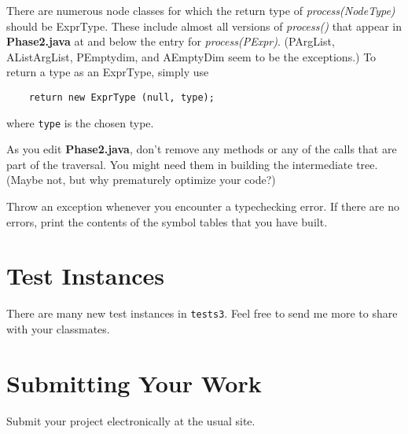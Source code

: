 \documentclass[11pt]{article}
\begin{document}
There are numerous node classes for which the return type of {\it process(NodeType)} should be ExprType.  These include almost all versions of {\it process()} that appear in {\bf Phase2.java} at and below the entry for {\it{process(PExpr)}}.  (PArgList, AListArgList, PEmptydim, and AEmptyDim seem to be the exceptions.)  To return a type as an ExprType, simply use
\begin{verbatim}
    return new ExprType (null, type);
\end{verbatim}
where \verb'type' is the chosen type.

As you edit {\bf Phase2.java}, don't remove any methods or any of the calls that are part of the traversal.  You might need them in building the intermediate tree.  (Maybe not, but why prematurely optimize your code?)

Throw an exception whenever you encounter a typechecking error.  If there are no errors, print the contents of the symbol tables that you have built.

\section{Test Instances}
There are many new test instances in \verb'tests3'.  Feel free to send me more to share with your classmates.

\section{Submitting Your Work}
Submit your project electronically at the usual site.
\end{document}
